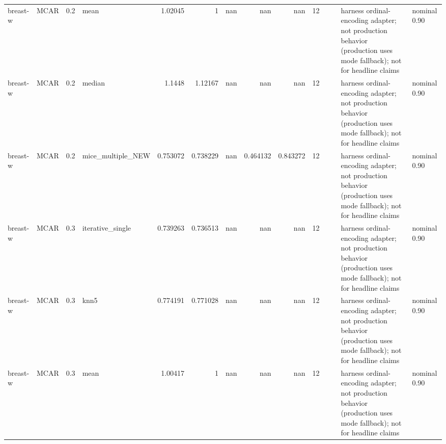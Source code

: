 \begin{table}[ht]
\begin{tabular}{llrlrrrrrrllll}
 breast-w             & MCAR        &         0.2 & mean              &       1.02045  &             1        &               nan        &                     nan        &                       nan        &        12 &                    &                                         & harness ordinal-encoding adapter; not production behavior (production uses mode fallback); not for headline claims & nominal 0.90              \\
 breast-w             & MCAR        &         0.2 & median            &       1.1448   &             1.12167  &               nan        &                     nan        &                       nan        &        12 &                    &                                         & harness ordinal-encoding adapter; not production behavior (production uses mode fallback); not for headline claims & nominal 0.90              \\
 breast-w             & MCAR        &         0.2 & mice\_multiple\_NEW &       0.753072 &             0.738229 &               nan        &                       0.464132 &                         0.843272 &        12 &                    &                                         & harness ordinal-encoding adapter; not production behavior (production uses mode fallback); not for headline claims & nominal 0.90              \\
 breast-w             & MCAR        &         0.3 & iterative\_single  &       0.739263 &             0.736513 &               nan        &                     nan        &                       nan        &        12 &                    &                                         & harness ordinal-encoding adapter; not production behavior (production uses mode fallback); not for headline claims & nominal 0.90              \\
 breast-w             & MCAR        &         0.3 & knn5              &       0.774191 &             0.771028 &               nan        &                     nan        &                       nan        &        12 &                    &                                         & harness ordinal-encoding adapter; not production behavior (production uses mode fallback); not for headline claims & nominal 0.90              \\
 breast-w             & MCAR        &         0.3 & mean              &       1.00417  &             1        &               nan        &                     nan        &                       nan        &        12 &                    &                                         & harness ordinal-encoding adapter; not production behavior (production uses mode fallback); not for headline claims & nominal 0.90              \\

\end{tabular}
\end{table}
